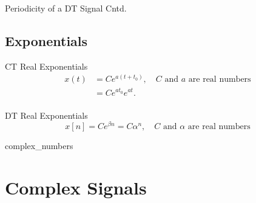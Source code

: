\begin{frame}{Periodicity of a DT Signal Cntd.}
    \centering
    
    \vspace{0.1in}
    
    \vspace{0.1in}
    
    \vspace{0.1in}
    
\end{frame}
%
\subsection{Exponentials}

\begin{frame}[plain]{CT Real Exponentials}
    \begin{equation*}
        \begin{split}
            x(t) &= Ce^{a(t+t_0)}, \quad C \text{ and } a \text{ are real numbers}\\
            &=   Ce^{at_0}e^{at}.\\
        \end{split}
    \end{equation*}
    {
        {
            \centering
            
        }
    }
\end{frame}

\begin{frame}[plain]{DT Real Exponentials}
    \begin{equation*}
        x[n] = Ce^{\beta n} = C\alpha^n, \quad C \text{ and } \alpha \text{ are real numbers}
    \end{equation*}
\end{frame}

\begin{frame}[plain]
    {
        {
            \centering
            
        }
    }
\end{frame}

\begin{frame}[plain]
    {
        {
            \centering
            
        }
    }
\end{frame}

{
    {complex_numbers}
}
{

    
}

\section{Complex Signals}
